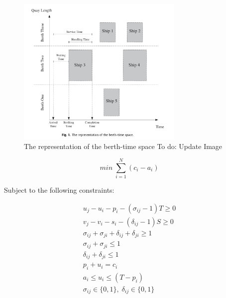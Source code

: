 \documentclass[letterpaper, 10pt, conference]{IEEEtran}
\newcommand{\TODO}[1]{{\color{green} To do: #1}} %
\begin{document}
\begin{figure}
	\centerline{\includegraphics[width=8cm]{bap.png}}
	\caption{The representation of the berth-time space \TODO{Update Image}}
	\label{fig:bap}
\end{figure}

\begin{equation}
	\label{eq:bapobjective}
	min\; \sum_{i=1}^N (c_i - a_i)
\end{equation}

Subject to the following constraints:

\begin{subequations}
\label{eq:bapconstrs}
\begin{align}
    u_j - u_i - p_i - (\sigma_{ij} - 1)T \geq 0                     \label{subeq:baptime}         \\
    v_j - v_i - s_i - (\delta_{ij} - 1)S \geq 0                     \label{subeq:bapspace}        \\
    \sigma_{ij} + \sigma_{ji} + \delta_{ij} + \delta_{ji} \geq 1    \label{subeq:bapvalid_pos}    \\
    \sigma_{ij} + \sigma_{ji} \leq 1                                \label{subeq:bapsigma}        \\
    \delta_{ij} + \delta_{ji} \leq 1                                \label{subeq:bapdelta}        \\
    p_i + u_i = c_i                                                 \label{subeq:bapdetach}       \\
    a_i \leq u_i \leq (T - p_i)                                     \label{subeq:bapvalid_starts} \\
    \sigma_{ij} \in \{0,1\},\;\delta_{ij} \in \{0,1\}               \label{subeq:sdspace}
\end{align}
\end{subequations}
\end{document}
